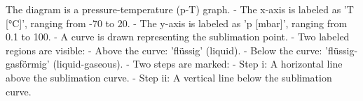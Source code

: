 The diagram is a pressure-temperature (p-T) graph.  
- The x-axis is labeled as 'T [°C]', ranging from -70 to 20.  
- The y-axis is labeled as 'p [mbar]', ranging from 0.1 to 100.  
- A curve is drawn representing the sublimation point.  
- Two labeled regions are visible:  
  - Above the curve: 'flüssig' (liquid).  
  - Below the curve: 'flüssig-gasförmig' (liquid-gaseous).  
- Two steps are marked:  
  - Step i: A horizontal line above the sublimation curve.  
  - Step ii: A vertical line below the sublimation curve.
